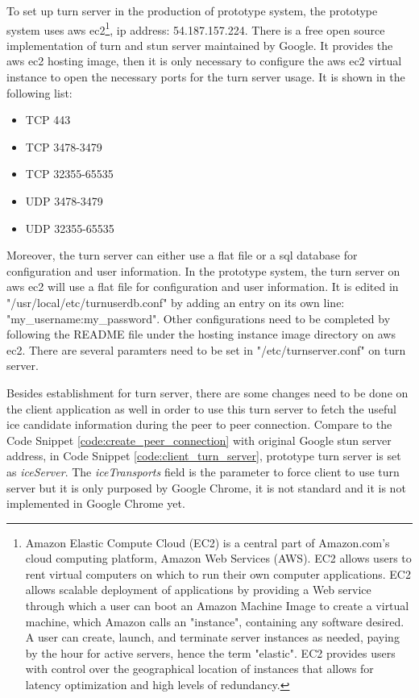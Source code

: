 \par To set up \gls{turn} server in the production of prototype system, the prototype system uses \gls{aws} \gls{ec2}\footnote{Amazon Elastic Compute Cloud (EC2) is a central part of Amazon.com's cloud computing platform, Amazon Web Services (AWS). EC2 allows users to rent virtual computers on which to run their own computer applications. EC2 allows scalable deployment of applications by providing a Web service through which a user can boot an Amazon Machine Image to create a virtual machine, which Amazon calls an "instance", containing any software desired. A user can create, launch, and terminate server instances as needed, paying by the hour for active servers, hence the term "elastic". EC2 provides users with control over the geographical location of instances that allows for latency optimization and high levels of redundancy.\cite{wiki:ec2}}, \gls{ip} address: 54.187.157.224. There is a free open source implementation of \gls{turn} and \gls{stun} server maintained by Google. It provides the \gls{aws} \gls{ec2} hosting image, then it is only necessary to configure the \gls{aws} \gls{ec2} virtual instance to open the necessary ports for the \gls{turn} server usage. It is shown in the following list:
\begin{itemize}[topsep=-1em,parsep=0em,itemsep=0em]
 \item TCP 443
 \item TCP 3478-3479
 \item TCP 32355-65535
 \item UDP 3478-3479
 \item UDP 32355-65535
\end{itemize}

\par Moreover, the \gls{turn} server can either use a flat file or a \gls{sql} database for configuration and user information. In the prototype system, the \gls{turn} server on \gls{aws} \gls{ec2} will use a flat file for configuration and user information. It is edited in "/usr/local/etc/turnuserdb.conf" by adding an entry on its own line: "my\_username:my\_password".\cite{dialogic:turn} Other configurations need to be completed by following the README file under the hosting instance image directory on \gls{aws} \gls{ec2}. There are several paramters need to be set in "/etc/turnserver.conf" on \gls{turn} server.

\par Besides establishment for \gls{turn} server, there are some changes need to be done on the client application as well in order to use this \gls{turn} server to fetch the useful \gls{ice} candidate information during the peer to peer connection. Compare to the Code Snippet \ref{code:create_peer_connection} with original Google \gls{stun} server address, in Code Snippet \ref{code:client_turn_server}, prototype \gls{turn} server is set as \textit{iceServer}. The \textit{iceTransports} field is the parameter to force client to use \gls{turn} server but it is only purposed by Google Chrome, it is not standard and it is not implemented in Google Chrome yet.

